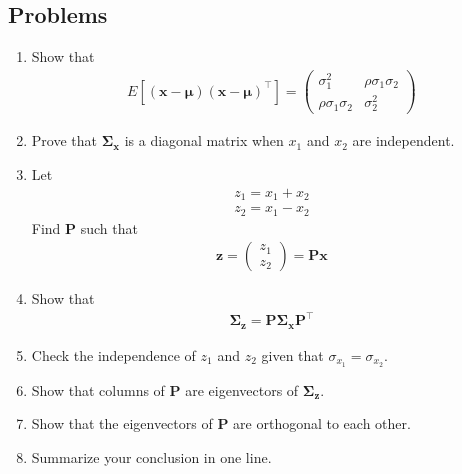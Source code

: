 \documentclass[journal,12pt,onecolumn]{IEEEtran}
\renewcommand\thesection{\arabic{section}}
\renewcommand\thesubsection{\thesection.\arabic{subsection}}
\providecommand{\sbrak}[1]{\ensuremath{{}\left[#1\right]}}
\providecommand{\brak}[1]{\ensuremath{\left(#1\right)}}
\theoremstyle{remark}
\newcommand{\myvec}[1]{\ensuremath{\begin{pmatrix}#1\end{pmatrix}}}
\numberwithin{equation}{section}
\let\vec\mathbf
\begin{document}
\subsection{Problems}
\begin{enumerate}[label=\arabic*.,ref=\thesubsection.\theenumi]
\item Show that
\begin{align}
	E\sbrak{\brak{\vec{x}-\bm{\mu}}\brak{\vec{x}-\bm{\mu}}^{\top}} = \myvec{\sigma^2_{1}&\rho\sigma_{1}\sigma_{2}\\\rho\sigma_{1}\sigma_{2}&\sigma^2_{2}}
\end{align}
\item Prove that $\vec{\Sigma_{x}}$ is a diagonal matrix when $x_1$ and $x_2$ are independent.
\item Let
\begin{align}
z_1 = x_1+x_2 \\ 
z_2 = x_1-x_2 
\end{align}
		Find $\vec{P}$ such that
\begin{align}
	\vec{z} =\myvec{z_1\\ z_2}  = \vec{P}\vec{x}
\end{align}
\item Show that 
	\begin{align} 
\vec{\Sigma_{z}} = \vec{P} \vec{\Sigma_x} \vec{P}^{\top} 
\end{align} 
\item 
	 Check the independence of $z_1$ and $z_2$ given that $\sigma_{x_1} = \sigma_{x_2}$.
\item Show that columns of $\vec{P}$ are eigenvectors of $\vec{\Sigma_z}$.
\item Show that the eigenvectors of $\vec{P}$ are orthogonal to each other.
\item Summarize your conclusion in one line.
\end{enumerate}
\end{document}

